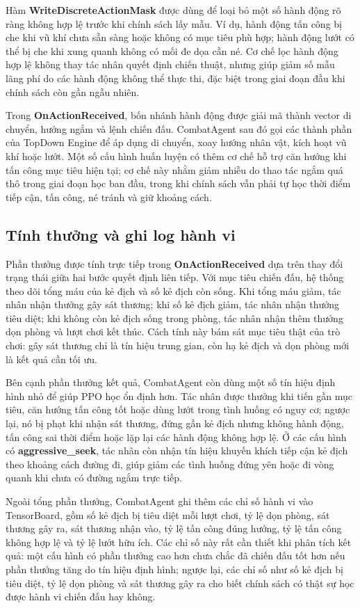 Hàm \textbf{WriteDiscreteActionMask} được dùng để loại bỏ một số hành động rõ ràng không hợp lệ trước khi chính sách lấy mẫu. Ví dụ, hành động tấn công bị che khi vũ khí chưa sẵn sàng hoặc không có mục tiêu phù hợp; hành động lướt có thể bị che khi xung quanh không có mối đe dọa cần né. Cơ chế lọc hành động hợp lệ không thay tác nhân quyết định chiến thuật, nhưng giúp giảm số mẫu lãng phí do các hành động không thể thực thi, đặc biệt trong giai đoạn đầu khi chính sách còn gần ngẫu nhiên.

Trong \textbf{OnActionReceived}, bốn nhánh hành động được giải mã thành vector di chuyển, hướng ngắm và lệnh chiến đấu. CombatAgent sau đó gọi các thành phần của TopDown Engine để áp dụng di chuyển, xoay hướng nhân vật, kích hoạt vũ khí hoặc lướt. Một số cấu hình huấn luyện có thêm cơ chế hỗ trợ căn hướng khi tấn công mục tiêu hiện tại; cơ chế này nhằm giảm nhiễu do thao tác ngắm quá thô trong giai đoạn học ban đầu, trong khi chính sách vẫn phải tự học thời điểm tiếp cận, tấn công, né tránh và giữ khoảng cách.

\subsection{Tính thưởng và ghi log hành vi}

Phần thưởng được tính trực tiếp trong \textbf{OnActionReceived} dựa trên thay đổi trạng thái giữa hai bước quyết định liên tiếp. Với mục tiêu chiến đấu, hệ thống theo dõi tổng máu của kẻ địch và số kẻ địch còn sống. Khi tổng máu giảm, tác nhân nhận thưởng gây sát thương; khi số kẻ địch giảm, tác nhân nhận thưởng tiêu diệt; khi không còn kẻ địch sống trong phòng, tác nhân nhận thêm thưởng dọn phòng và lượt chơi kết thúc. Cách tính này bám sát mục tiêu thật của trò chơi: gây sát thương chỉ là tín hiệu trung gian, còn hạ kẻ địch và dọn phòng mới là kết quả cần tối ưu.

Bên cạnh phần thưởng kết quả, CombatAgent còn dùng một số tín hiệu định hình nhỏ để giúp PPO học ổn định hơn. Tác nhân được thưởng khi tiến gần mục tiêu, căn hướng tấn công tốt hoặc dùng lướt trong tình huống có nguy cơ; ngược lại, nó bị phạt khi nhận sát thương, đứng gần kẻ địch nhưng không hành động, tấn công sai thời điểm hoặc lặp lại các hành động không hợp lệ. Ở các cấu hình có \textbf{aggressive\_seek}, tác nhân còn nhận tín hiệu khuyến khích tiếp cận kẻ địch theo khoảng cách đường đi, giúp giảm các tình huống đứng yên hoặc đi vòng quanh khi chưa có đường ngắm trực tiếp.

Ngoài tổng phần thưởng, CombatAgent ghi thêm các chỉ số hành vi vào TensorBoard, gồm số kẻ địch bị tiêu diệt mỗi lượt chơi, tỷ lệ dọn phòng, sát thương gây ra, sát thương nhận vào, tỷ lệ tấn công đúng hướng, tỷ lệ tấn công không hợp lệ và tỷ lệ lướt hữu ích. Các chỉ số này rất cần thiết khi phân tích kết quả: một cấu hình có phần thưởng cao hơn chưa chắc đã chiến đấu tốt hơn nếu phần thưởng tăng do tín hiệu định hình; ngược lại, các chỉ số như số kẻ địch bị tiêu diệt, tỷ lệ dọn phòng và sát thương gây ra cho biết chính sách có thật sự học được hành vi chiến đấu hay không.

